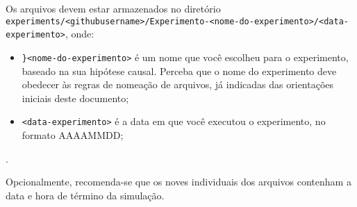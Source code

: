 Os arquivos devem estar armazenados no diretório \verb|experiments/<githubusername>/Experimento-<nome-do-experimento>/<data-experimento>|, onde:
\begin{itemize}
    \item \verb|}<nome-do-experimento>| é um nome que você escolheu para o experimento, baseado na sua hipótese causal. Perceba que o nome do experimento deve obedecer às regras de nomeação de arquivos, já indicadas das orientações iniciais deste documento;
    \item \verb|<data-experimento>| é a data em que você executou o experimento, no formato AAAAMMDD;
\end{itemize}.

Opcionalmente, recomenda-se que os noves individuais dos arquivos contenham a data e hora de término da simulação.



